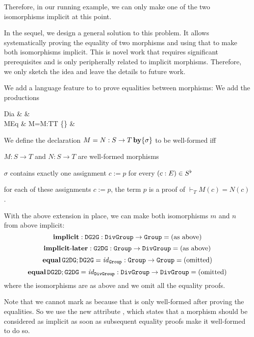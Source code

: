 Therefore, in our running example, we can only make one of the two isomorphisms implicit at this point.

In the sequel, we design a general solution to this problem.
It allows systematically proving the equality of two morphisms and using that to make both isomorphisms implicit.
This is novel work that requires significant prerequisites and is only peripherally related to implicit morphisms.
Therefore, we only sketch the idea and leave the details to future work.

We add a language feature to \mmt to prove equalities between morphisms:
We add the productions
\begin{grammar}
Dia   &   &\\
MEq   &  M=M:T\to T  \{\} &\\
\end{grammar}


We define the declaration $M=N:S\to T \operatorname{\mathbf{by}} \{\sigma\}$ to be well-formed iff
\begin{compactitem} 
  \item $M:S\to T$ and $N:S\to T$ are well-formed morphisms
  \item $\sigma$ contains exactly one assignment $c:=p$ for every $(c:E)\in S^\flat$
  \item for each of these assignments $c:=p$, the term $p$ is a proof of $\vdash_T M(c)=N(c)$.
\end{compactitem}

\begin{example}[Isomorphisms]
With the above extension in place, we can make both isomorphisms $m$ and $n$ from above implicit:
 \[\operatorname{\mathbf{implicit}}:\operatorname{\mathtt{DG2G}}:\operatorname{\mathtt{DivGroup}}\to\operatorname{\mathtt{Group}}=\text{(as above)}\]
 \[\operatorname{\mathbf{implicit-later}}:\operatorname{\mathtt{G2DG}}:\operatorname{\mathtt{Group}}\to\operatorname{\mathtt{DivGroup}}=\text{(as above)}\]
 \[\operatorname{\mathbf{equal}}\operatorname{\mathtt{G2DG}};\operatorname{\mathtt{DG2G}}=\mathit{id}_{\operatorname{\mathtt{Group}}}:\operatorname{\mathtt{Group}}\to\operatorname{\mathtt{Group}}=\text{(omitted)}\]
 \[\operatorname{\mathbf{equal}}\operatorname{\mathtt{DG2D}};\operatorname{\mathtt{G2DG}}=\mathit{id}_{\operatorname{\mathtt{DivGroup}}}:\operatorname{\mathtt{DivGroup}}\to\operatorname{\mathtt{DivGroup}}=\text{(omitted)}\]
where the isomorphisms are as above and we omit all the equality proofs.

Note that we cannot mark  as  because that is only well-formed after proving the equalities.
So we use the new attribute , which states that a morphism should be considered as implicit as soon as subsequent equality proofs make it well-formed to do so.
\end{example}

